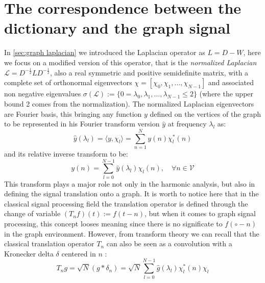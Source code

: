 \section{The correspondence between the dictionary and the graph signal}
In \autoref{sec:graph laplacian} we introduced the Laplacian operator as $L = D - W$, here we focus on a modified version of this operator, that is the \textit{normalized Laplacian} $\mathcal{L} = D^{-\frac{1}{2}}LD^{-\frac{1}{2}}$, also a real symmetric and positive semidefinite matrix, with a complete set of orthonormal eigenvectors $\textbf{$\chi$} = [\chi_0,\chi_1,\dots,\chi_{N-1}]$ and associated non negative eigenvalues $\sigma(\mathcal{L}) := \{ 0 = \lambda_0,\lambda_1,\dots,\lambda_{N-1} \leq 2 \}$ (where the upper bound 2 comes from the normalization).
The normalized Laplacian eigenvectors are Fourier basis, this bringing any function $y$ defined on the vertices of the graph to be represented in his Fourier transform version $\hat{y}$ at frequency $\lambda_l$ as:
\begin{equation}
\hat{y}(\lambda_l) = \langle y, \chi_l \rangle = \sum_{n=1}^{N} y(n)\chi_l^{*}(n)
\end{equation}
and its relative inverse transform to be:
\begin{equation}
y(n) = \sum_{l=0}^{N-1} \hat{y}(\lambda_l)\chi_l(n), \quad \forall n \in \mathcal{V}
\end{equation}
This transform plays a major role not only in the harmonic analysis, but also in defining the signal translation onto a graph. It is worth to notice here that in the classical signal processing field the translation operator is defined through the change of variable $(T_n f)(t) := f(t-n)$, but when it comes to graph signal processing, this concept looses meaning since there is no significate to $f(\circ - n)$ in the graph environment. However, from transform theory we can recall that the classical translation operator $T_n$ can also be seen as a convolution with a Kronecker delta $\delta$ centered in $n$\cite{Shuman2013} \cite{Thanou2014}:
\begin{equation}
T_n g = \sqrt{N}(g * \delta_n) = \sqrt{N}\sum_{l=0}^{N-1}\hat{g}(\lambda_l)\chi_l^{*}(n)\chi_l
\label{eq:translation}
\end{equation}

